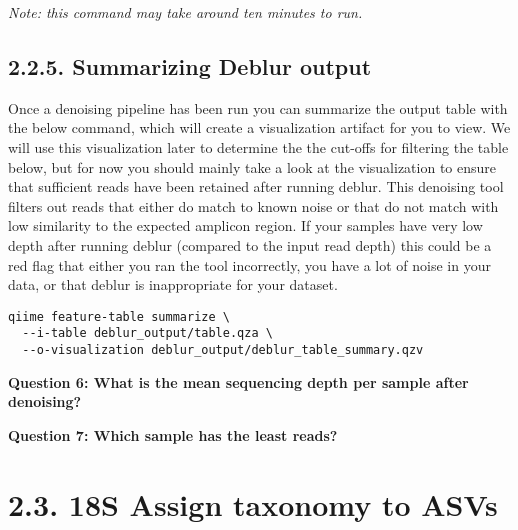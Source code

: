 \documentclass[
]{book}
\begin{document}
\emph{Note: this command may take around ten minutes to run.}

\subsection{2.2.5. Summarizing Deblur output}\label{summarizing-deblur-output-1}

Once a denoising pipeline has been run you can summarize the output table with the below command, which will create a visualization artifact for you to view. We will use this visualization later to determine the the cut-offs for filtering the table below, but for now you should mainly take a look at the visualization to ensure that sufficient reads have been retained after running deblur. This denoising tool filters out reads that either do match to known noise or that do not match with low similarity to the expected amplicon region. If your samples have very low depth after running deblur (compared to the input read depth) this could be a red flag that either you ran the tool incorrectly, you have a lot of noise in your data, or that deblur is inappropriate for your dataset.

\begin{verbatim}
qiime feature-table summarize \
  --i-table deblur_output/table.qza \
  --o-visualization deblur_output/deblur_table_summary.qzv
\end{verbatim}

\textbf{Question 6: What is the mean sequencing depth per sample after denoising?}

\textbf{Question 7: Which sample has the least reads?}

\section{2.3. 18S Assign taxonomy to ASVs}\label{s-assign-taxonomy-to-asvs-1}
\end{document}

